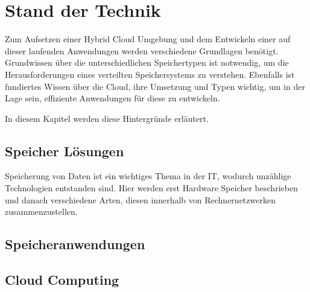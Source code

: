 \chapter{Stand der Technik}\label{ch:background}

Zum Aufsetzen einer Hybrid Cloud Umgebung und dem Entwickeln einer auf dieser laufenden Anwendungen werden verschiedene Grundlagen benötigt. Grundwissen über die unterschiedlichen Speichertypen ist notwendig, um die Herausforderungen eines verteilten Speichersystems zu verstehen. Ebenfalls ist fundiertes Wissen über die Cloud, ihre Umsetzung und Typen wichtig, um in der Lage sein, effiziente Anwendungen für diese zu entwickeln.

In diesem Kapitel werden diese Hintergründe erläutert.

\section{Speicher Lösungen}
Speicherung von Daten ist ein wichtiges Thema in der IT, wodurch unzählige Technologien entstanden sind. Hier werden erst Hardware Speicher beschrieben und danach verschiedene Arten, diesen innerhalb von Rechnernetzwerken zusammenzustellen.



\section{Speicheranwendungen}


\section{Cloud Computing}
